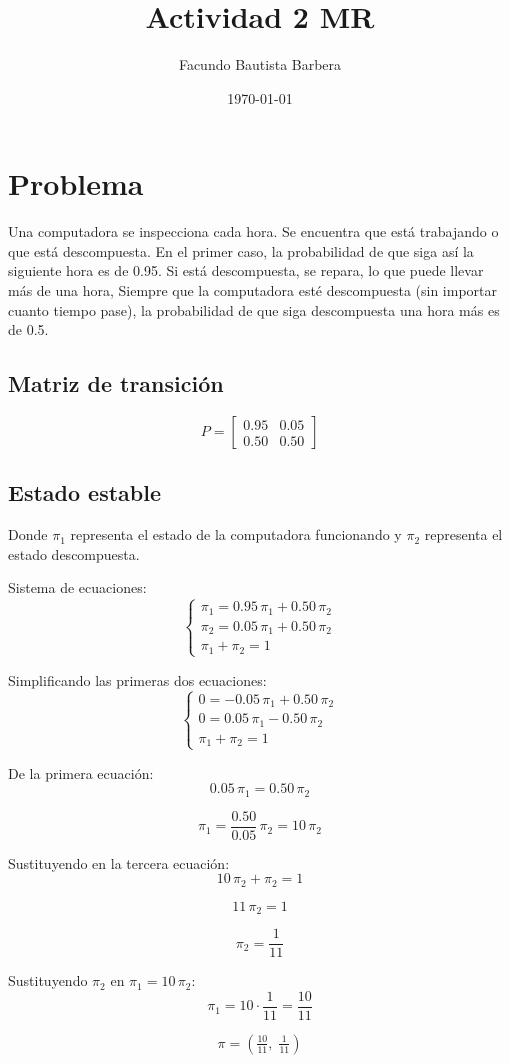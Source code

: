 \documentclass{article}
\title{Actividad 2 MR}
\author{Facundo Bautista Barbera}
\date{\today}
\begin{document}
\maketitle

\section*{Problema}

Una computadora se inspecciona cada hora.
Se encuentra que está trabajando o que está descompuesta.
En el primer caso, la probabilidad de que siga así la siguiente hora es de 0.95. Si está descompuesta, se repara, lo que puede llevar más de una hora, Siempre que la computadora esté descompuesta (sin importar cuanto tiempo pase), la probabilidad de que siga descompuesta una hora más es de 0.5.


\subsection*{Matriz de transición}

$$
	P = \begin{bmatrix}
		0.95 & 0.05 \\
		0.50 & 0.50
	\end{bmatrix}
$$

\newpage
\subsection*{Estado estable}

Donde $\pi_1$ representa el estado de la computadora funcionando y $\pi_2$ representa el estado descompuesta.

Sistema de ecuaciones:
$$
	\begin{cases}
		\pi_1 = 0.95\,\pi_1 + 0.50\,\pi_2 \\
		\pi_2 = 0.05\,\pi_1 + 0.50\,\pi_2 \\
		\pi_1 + \pi_2 = 1
	\end{cases}
$$

Simplificando las primeras dos ecuaciones:
$$
	\begin{cases}
		0 = -0.05\,\pi_1 + 0.50\,\pi_2 \\
		0 = 0.05\,\pi_1 - 0.50\,\pi_2  \\
		\pi_1 + \pi_2 = 1
	\end{cases}
$$

De la primera ecuación:
$$
	0.05\,\pi_1 = 0.50\,\pi_2
$$

$$
	\pi_1 = \frac{0.50}{0.05}\,\pi_2 = 10\,\pi_2
$$

Sustituyendo en la tercera ecuación:
$$
	10\,\pi_2 + \pi_2 = 1
$$

$$
	11\,\pi_2 = 1
$$

$$
	\pi_2 = \frac{1}{11}
$$

Sustituyendo $\pi_2$ en $\pi_1 = 10\,\pi_2$:
$$
	\pi_1 = 10 \cdot \frac{1}{11} = \frac{10}{11}
$$

$$
	\pi = \left( \tfrac{10}{11}, \; \tfrac{1}{11} \right)
$$
\end{document}
